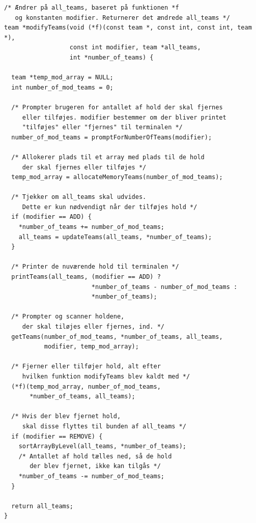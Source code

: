 \begin{source}
\begin{verbatim}
/* Ændrer på all_teams, baseret på funktionen *f 
   og konstanten modifier. Returnerer det ændrede all_teams */
team *modifyTeams(void (*f)(const team *, const int, const int, team *), 
                  const int modifier, team *all_teams, 
                  int *number_of_teams) {
                  
  team *temp_mod_array = NULL;
  int number_of_mod_teams = 0;

  /* Prompter brugeren for antallet af hold der skal fjernes 
     eller tilføjes. modifier bestemmer om der bliver printet 
     "tilføjes" eller "fjernes" til terminalen */
  number_of_mod_teams = promptForNumberOfTeams(modifier);

  /* Allokerer plads til et array med plads til de hold 
     der skal fjernes eller tilføjes */
  temp_mod_array = allocateMemoryTeams(number_of_mod_teams);

  /* Tjekker om all_teams skal udvides.
     Dette er kun nødvendigt når der tilføjes hold */
  if (modifier == ADD) {
    *number_of_teams += number_of_mod_teams;
    all_teams = updateTeams(all_teams, *number_of_teams);
  }

  /* Printer de nuværende hold til terminalen */
  printTeams(all_teams, (modifier == ADD) ? 
                        *number_of_teams - number_of_mod_teams : 
                        *number_of_teams);

  /* Prompter og scanner holdene, 
     der skal tiløjes eller fjernes, ind. */
  getTeams(number_of_mod_teams, *number_of_teams, all_teams, 
           modifier, temp_mod_array);

  /* Fjerner eller tilføjer hold, alt efter 
     hvilken funktion modifyTeams blev kaldt med */
  (*f)(temp_mod_array, number_of_mod_teams, 
       *number_of_teams, all_teams);

  /* Hvis der blev fjernet hold, 
     skal disse flyttes til bunden af all_teams */
  if (modifier == REMOVE) {
    sortArrayByLevel(all_teams, *number_of_teams);
    /* Antallet af hold tælles ned, så de hold 
       der blev fjernet, ikke kan tilgås */
    *number_of_teams -= number_of_mod_teams;
  }

  return all_teams;
}
\end{verbatim}
\label{code:modifyTeams}
\end{source}
